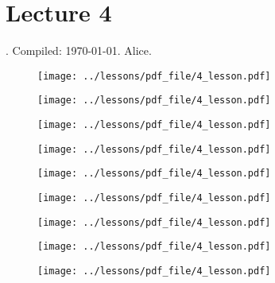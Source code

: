 \documentclass[../main/main.tex]{subfiles}
\begin{document}
\section{Lecture 4}
 . Compiled:  \today. Alice.

\begin{figure}[h!]
\centering
\texttt{[image: ../lessons/pdf\_file/4\_lesson.pdf]}
\end{figure}

\begin{figure}[h!]
\centering
\texttt{[image: ../lessons/pdf\_file/4\_lesson.pdf]}
\end{figure}



\newpage

\begin{figure}[h!]
\centering
\texttt{[image: ../lessons/pdf\_file/4\_lesson.pdf]}
\end{figure}

\begin{figure}[h!]
\centering
\texttt{[image: ../lessons/pdf\_file/4\_lesson.pdf]}
\end{figure}

\newpage

\begin{figure}[h!]
\centering
\texttt{[image: ../lessons/pdf\_file/4\_lesson.pdf]}
\end{figure}

\begin{figure}[h!]
\centering
\texttt{[image: ../lessons/pdf\_file/4\_lesson.pdf]}
\end{figure}




\newpage

\begin{figure}[h!]
\centering
\texttt{[image: ../lessons/pdf\_file/4\_lesson.pdf]}
\end{figure}

\begin{figure}[h!]
\centering
\texttt{[image: ../lessons/pdf\_file/4\_lesson.pdf]}
\end{figure}


\newpage

\begin{figure}[h!]
\centering
\texttt{[image: ../lessons/pdf\_file/4\_lesson.pdf]}
\end{figure}
\end{document}
